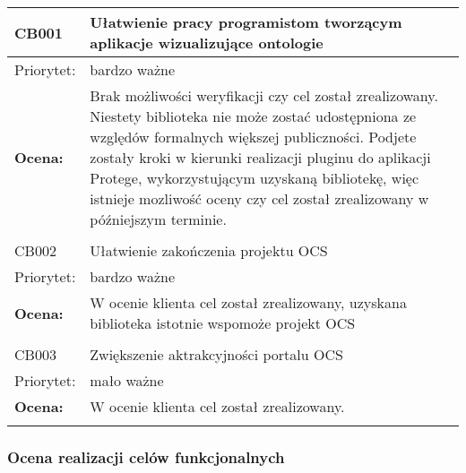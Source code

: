 \begin{center}
\begin{tabular}{|m{3cm}|m{9cm}|} \hline

CB001 & Ułatwienie pracy programistom tworzącym aplikacje wizualizujące ontologie  \\ \hline
Priorytet: & bardzo ważne \\ \hline
\textbf{Ocena:} & Brak możliwości weryfikacji czy cel został zrealizowany. Niestety biblioteka nie może zostać udostępniona ze względów formalnych większej publiczności. Podjete zostały kroki w kierunki realizacji pluginu do aplikacji Protege, wykorzystującym uzyskaną bibliotekę, więc istnieje mozliwość oceny czy cel został zrealizowany w późniejszym terminie.    \\ \hline

\multicolumn{2}{c}{} \\


 \hline
CB002 & Ułatwienie zakończenia projektu OCS   \\ \hline
Priorytet: & bardzo ważne \\ \hline
\textbf{Ocena:} & W ocenie klienta cel został zrealizowany, uzyskana biblioteka istotnie wspomoże projekt OCS \\ \hline
\multicolumn{2}{c}{} \\
 \hline
CB003 & Zwiększenie aktrakcyjności portalu OCS   \\ \hline
Priorytet: & mało ważne \\ \hline
\textbf{Ocena:} & W ocenie klienta cel został zrealizowany. \\ \hline
\multicolumn{2}{c}{} \\
\end{tabular}


\end{center}

\subsubsection{Ocena realizacji celów funkcjonalnych}

